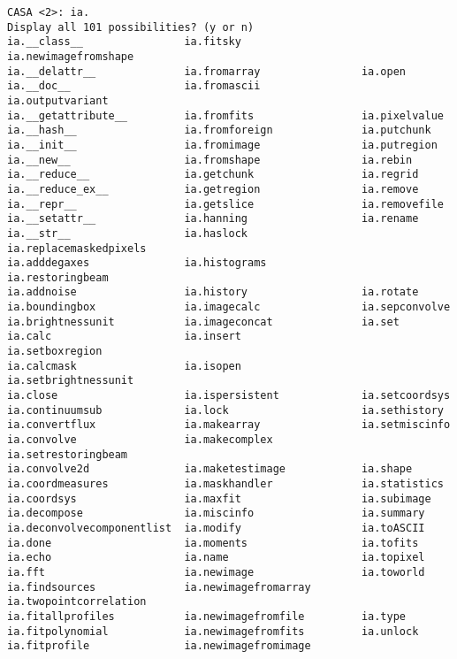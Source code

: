 \begin{verbatim}
CASA <2>: ia.
Display all 101 possibilities? (y or n)
ia.__class__                ia.fitsky                   ia.newimagefromshape
ia.__delattr__              ia.fromarray                ia.open
ia.__doc__                  ia.fromascii                ia.outputvariant
ia.__getattribute__         ia.fromfits                 ia.pixelvalue
ia.__hash__                 ia.fromforeign              ia.putchunk
ia.__init__                 ia.fromimage                ia.putregion
ia.__new__                  ia.fromshape                ia.rebin
ia.__reduce__               ia.getchunk                 ia.regrid
ia.__reduce_ex__            ia.getregion                ia.remove
ia.__repr__                 ia.getslice                 ia.removefile
ia.__setattr__              ia.hanning                  ia.rename
ia.__str__                  ia.haslock                  ia.replacemaskedpixels
ia.adddegaxes               ia.histograms               ia.restoringbeam
ia.addnoise                 ia.history                  ia.rotate
ia.boundingbox              ia.imagecalc                ia.sepconvolve
ia.brightnessunit           ia.imageconcat              ia.set
ia.calc                     ia.insert                   ia.setboxregion
ia.calcmask                 ia.isopen                   ia.setbrightnessunit
ia.close                    ia.ispersistent             ia.setcoordsys
ia.continuumsub             ia.lock                     ia.sethistory
ia.convertflux              ia.makearray                ia.setmiscinfo
ia.convolve                 ia.makecomplex              ia.setrestoringbeam
ia.convolve2d               ia.maketestimage            ia.shape
ia.coordmeasures            ia.maskhandler              ia.statistics
ia.coordsys                 ia.maxfit                   ia.subimage
ia.decompose                ia.miscinfo                 ia.summary
ia.deconvolvecomponentlist  ia.modify                   ia.toASCII
ia.done                     ia.moments                  ia.tofits
ia.echo                     ia.name                     ia.topixel
ia.fft                      ia.newimage                 ia.toworld
ia.findsources              ia.newimagefromarray        ia.twopointcorrelation
ia.fitallprofiles           ia.newimagefromfile         ia.type
ia.fitpolynomial            ia.newimagefromfits         ia.unlock
ia.fitprofile               ia.newimagefromimage        
\end{verbatim}
\normalsize

